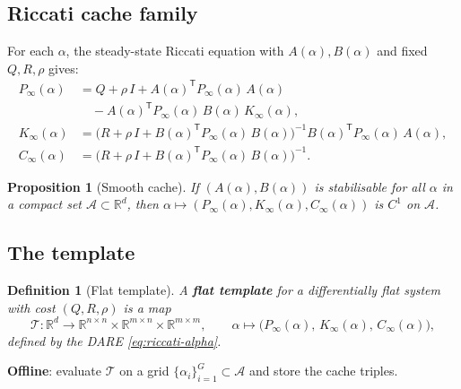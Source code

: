\documentclass[11pt]{article}
\newtheorem{proposition}[theorem]{Proposition}
\newtheorem{definition}[theorem]{Definition}
\newcommand{\R}{\mathbb{R}}
\newcommand{\trans}{\mathsf{T}}
\begin{document}
\subsection{Riccati cache family}

For each $\alpha$, the steady-state Riccati equation
with $A(\alpha), B(\alpha)$ and fixed $Q, R, \rho$ gives:
\begin{equation}\label{eq:riccati-alpha}
\begin{aligned}
  P_\infty(\alpha)
  &= Q + \rho\, I + A(\alpha)^\trans P_\infty(\alpha)\, A(\alpha)
  \\
  &\quad - A(\alpha)^\trans P_\infty(\alpha)\, B(\alpha)\,
    K_\infty(\alpha), \\[4pt]
  K_\infty(\alpha)
  &= \bigl(R + \rho\, I + B(\alpha)^\trans
    P_\infty(\alpha)\, B(\alpha)\bigr)^{-1}
    B(\alpha)^\trans P_\infty(\alpha)\, A(\alpha), \\[4pt]
  C_\infty(\alpha)
  &= \bigl(R + \rho\, I + B(\alpha)^\trans
    P_\infty(\alpha)\, B(\alpha)\bigr)^{-1}.
\end{aligned}
\end{equation}

\begin{proposition}[Smooth cache]\label{prop:smooth-cache}
If $(A(\alpha), B(\alpha))$ is stabilisable for all
$\alpha$ in a compact set $\mathcal{A} \subset \R^d$,
then $\alpha \mapsto (P_\infty(\alpha), K_\infty(\alpha),
C_\infty(\alpha))$ is $C^1$ on $\mathcal{A}$.
\end{proposition}

\subsection{The template}

\begin{definition}[Flat template]\label{def:template}
A \textbf{flat template} for a differentially flat
system with cost $(Q, R, \rho)$ is a map
\begin{equation}\label{eq:template}
  \mathcal{T} : \R^d \to
  \R^{n\times n} \times \R^{m\times n} \times \R^{m\times m},
  \qquad
  \alpha \mapsto
  \bigl(P_\infty(\alpha),\, K_\infty(\alpha),\,
  C_\infty(\alpha)\bigr),
\end{equation}
defined by the DARE \eqref{eq:riccati-alpha}.
\end{definition}

\noindent
\textbf{Offline}: evaluate $\mathcal{T}$
on a grid $\{\alpha_i\}_{i=1}^G \subset \mathcal{A}$
and store the cache triples.
\end{document}
